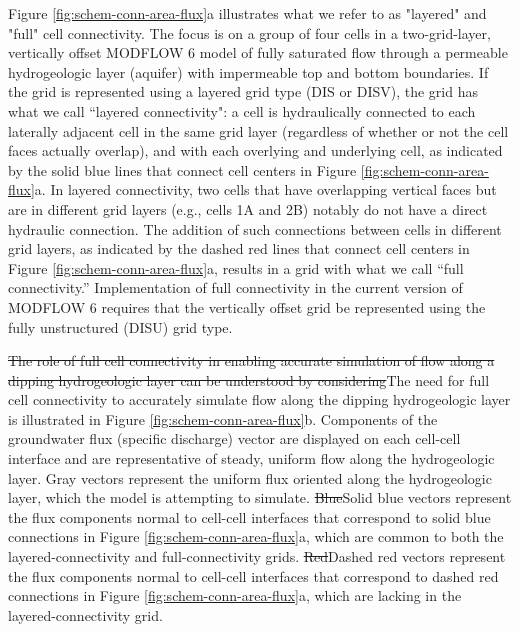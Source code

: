 \documentclass{article}
\begin{document}
Figure \ref{fig:schem-conn-area-flux}a illustrates what we refer to as "layered" and "full" cell connectivity. The focus is on a group of four cells in a two-grid-layer, vertically offset MODFLOW 6 model of fully saturated flow through a permeable hydrogeologic layer (aquifer) with impermeable top and bottom boundaries. If the grid is represented using a layered grid type (DIS or DISV), the grid has what we call ``layered connectivity": a cell is hydraulically connected to each laterally adjacent cell in the same grid layer (regardless of whether or not the cell faces actually overlap), and with each overlying and underlying cell, as indicated by the {\color{red}solid} blue lines that connect cell centers in Figure \ref{fig:schem-conn-area-flux}a. In layered connectivity, two cells that have overlapping vertical faces but are in different grid layers (e.g., cells 1A and 2B) notably do not have a direct hydraulic connection. The addition of such connections between cells in different grid layers, as indicated by the {\color{red}dashed} red lines that connect cell centers in Figure \ref{fig:schem-conn-area-flux}a, results in a grid with what we call ``full connectivity.''  Implementation of full connectivity in the current version of MODFLOW 6 \citep{modflow650software} requires that the vertically offset grid be represented using the fully unstructured (DISU) grid type.

{\color{red} \sout{The role of full cell connectivity in enabling accurate simulation of flow along a dipping hydrogeologic layer can be understood by considering}The need for full cell connectivity to accurately simulate flow along the dipping hydrogeologic layer is illustrated in} Figure \ref{fig:schem-conn-area-flux}b. Components of the groundwater flux (specific discharge) vector are displayed on each cell-cell interface and are representative of steady, uniform flow along the hydrogeologic layer. Gray vectors represent the uniform flux oriented along the hydrogeologic layer, which the model is attempting to simulate. {\color{red} \sout{Blue}Solid blue} vectors represent the flux components normal to cell-cell interfaces that correspond to {\color{red}solid} blue connections in Figure \ref{fig:schem-conn-area-flux}a, which are common to both the layered-connectivity and full-connectivity grids. {\color{red} \sout{Red}Dashed red} vectors represent the flux components normal to cell-cell interfaces that correspond to {\color{red}dashed} red connections in Figure \ref{fig:schem-conn-area-flux}a, which are lacking in the layered-connectivity grid.
\end{document}
